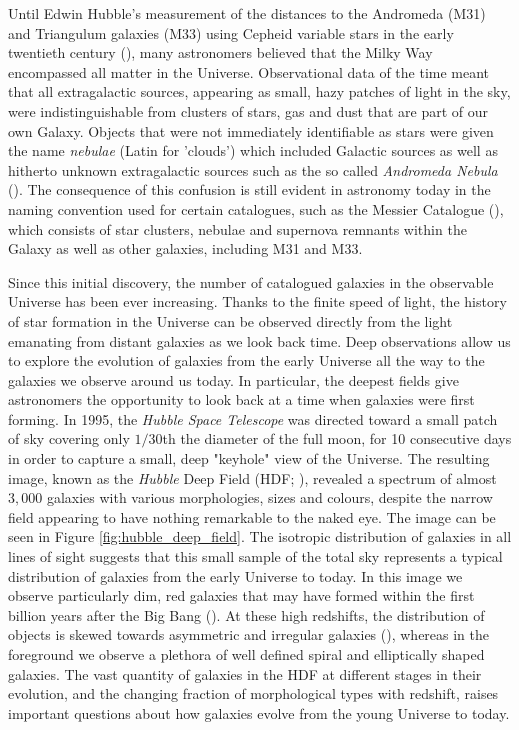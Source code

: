 \sloppy

Until Edwin Hubble's measurement of the distances to the Andromeda (M31) and Triangulum galaxies (M33) using Cepheid variable stars in the early twentieth century (\citealt{Hubble_1925}), many astronomers believed that the Milky Way encompassed all matter in the Universe. Observational data of the time meant that all extragalactic sources, appearing as small, hazy patches of light in the sky, were indistinguishable from clusters of stars, gas and dust that are part of our own Galaxy. Objects that were not immediately identifiable as stars were given the name \textit{nebulae} (Latin for 'clouds') which included Galactic sources as well as hitherto unknown extragalactic sources such as the so called \textit{Andromeda Nebula} (\citealt{Herschel_1785}). The consequence of this confusion is still evident in astronomy today in the naming convention used for certain catalogues, such as the Messier Catalogue (\citealt{Messier_1771, Messier_1781}), which consists of star clusters, nebulae and supernova remnants within the Galaxy as well as other galaxies, including M31 and M33.

Since this initial discovery, the number of catalogued galaxies in the observable Universe has been ever increasing. Thanks to the finite speed of light, the history of star formation in the Universe can be observed directly from the light emanating from distant galaxies as we look back time. Deep observations allow us to explore the evolution of galaxies from the early Universe all the way to the galaxies we observe around us today. In particular, the deepest fields give astronomers the opportunity to look back at a time when galaxies were first forming. In 1995, the \textit{Hubble Space Telescope} was directed toward a small patch of sky covering only $1/30$th the diameter of the full moon, for 10 consecutive days in order to capture a small, deep "keyhole" view of the Universe. The resulting image, known as the \textit{Hubble} Deep Field (HDF; \citealt{Williams_1996, Ferguson_2000}), revealed a spectrum of almost $3,000$ galaxies with various morphologies, sizes and colours, despite the narrow field appearing to have nothing remarkable to the naked eye. The image can be seen in Figure \ref{fig:hubble_deep_field}. The isotropic distribution of galaxies in all lines of sight suggests that this small sample of the total sky represents a typical distribution of galaxies from the early Universe to today. In this image we observe particularly dim, red galaxies that may have formed within the first billion years after the Big Bang (\citealt{Madau_1996}). At these high redshifts, the distribution of objects is skewed towards asymmetric and irregular galaxies (\citealt{Abraham_1996}), whereas in the foreground we observe a plethora of well defined spiral and elliptically shaped galaxies. The vast quantity of galaxies in the HDF at different stages in their evolution, and the changing fraction of morphological types with redshift, raises important questions about how galaxies evolve from the young Universe to today.


